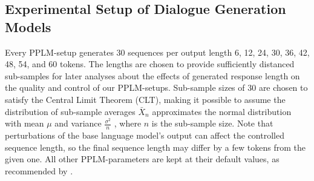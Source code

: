 
\subsection{Experimental Setup of Dialogue Generation Models}
\label{subsec:experimental_details_generation}



Every PPLM-setup generates 30 sequences per output length 6, 12, 24, 30, 36, 42, 48, 54, and 60 tokens. 
The lengths are chosen to provide sufficiently distanced sub-samples for later analyses about the effects of generated response length on the quality and control of our PPLM-setups.
Sub-sample sizes of 30 are chosen to satisfy the Central Limit Theorem (CLT), making it possible to assume the distribution of sub-sample averages $\bar{X}_n$ approximates the normal distribution with mean $\mu$ and variance $\frac{\sigma^2}{n}$ \citep{CLT2008springer}, where $n$ is the sub-sample size.
Note that perturbations of the base language model's output can affect the controlled sequence length, so the final sequence length may differ by a few tokens from the given one. All other PPLM-parameters are kept at their default values, as recommended by \cite{dathathri2019plug}. 

